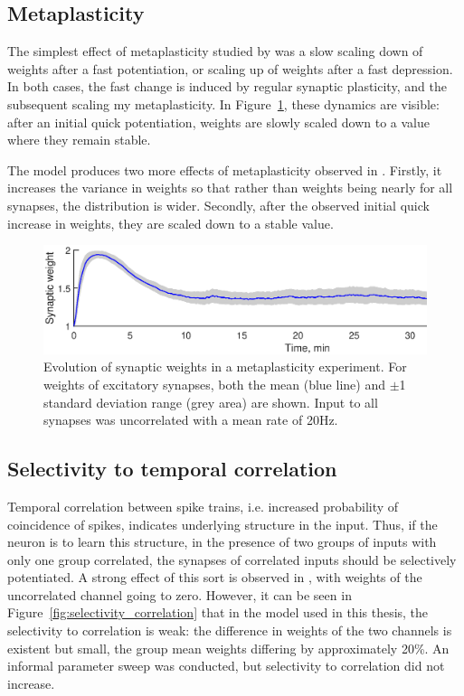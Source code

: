 \documentclass[a4paper,12pt]{report}
\theoremstyle{definition}
\begin{document}
\subsection{Metaplasticity}

The simplest effect of metaplasticity studied by \cite{yeung2004synaptic} was a slow scaling down of weights after a fast potentiation, or scaling up of weights after a fast depression. In both cases, the fast change is induced by regular synaptic plasticity, and the subsequent scaling my metaplasticity. In Figure~\ref{fig:valid_metaplasticity_evolution}, these dynamics are visible: after an initial quick potentiation, weights are slowly scaled down to a value where they remain stable.

The model produces two more effects of metaplasticity observed in \cite{yeung2004synaptic}. Firstly, it increases the variance in weights so that rather than weights being nearly for all synapses, the distribution is wider. Secondly, after the observed initial quick increase in weights, they are scaled down to a stable value.

\begin{figure}[h]
    \includegraphics[width=\textwidth]{figures/valid_metaplasticity_evolution.eps}
    \caption{Evolution of synaptic weights in a metaplasticity experiment. For weights of excitatory synapses, both the mean (blue line) and $\pm$1 standard deviation range (grey area) are shown. Input to all synapses was uncorrelated with a mean rate of 20Hz.}
    \label{fig:valid_metaplasticity_evolution}
\end{figure}




\subsection{Selectivity to temporal correlation} %

Temporal correlation between spike trains, i.e. increased probability of coincidence of spikes, indicates underlying structure in the input. Thus, if the neuron is to learn this structure, in the presence of two groups of inputs with only one group correlated, the synapses of correlated inputs should be selectively potentiated. A strong effect of this sort is observed in \cite{yeung2004synaptic}, with weights of the uncorrelated channel going to zero. However, it can be seen in Figure~\ref{fig:selectivity_correlation} that in the model used in this thesis, the selectivity to correlation is weak: the difference in weights of the two channels is existent but small, the group mean weights differing by approximately 20\%. An informal parameter sweep was conducted, but selectivity to correlation did not increase.
\end{document}
